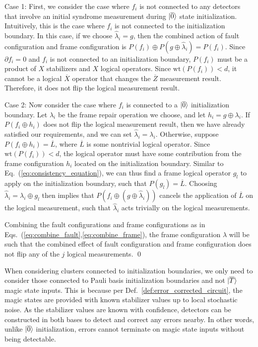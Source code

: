 Case 1: First, we consider the case where $f_i$ is not connected to any detectors that involve an initial syndrome measurement during $|{\overline{0}}\rangle$ state initialization.
%
Intuitively, this is the case where $f_i$ is not connected to the initialization boundary.
%
In this case, if we choose $\hat{\lambda}_i=g$, then the combined action of fault configuration and frame configuration is $P(f_i)\oplus P(g\oplus \hat{\lambda}_i)=P(f_i)$.
%
Since $\partial f_i=0$ and $f_i$ is not connected to an initialization boundary, $P(f_i)$ must be a product of $X$ stabilizers and $X$ logical operators.
%
Since $\textrm{wt}(P(f_i))<d$, it cannot be a logical $\overline{X}$ operator that changes the $\overline{Z}$ measurement result.
%
Therefore, it does not flip the logical measurement result.

Case 2: Now consider the case where $f_i$ is connected to a $|{\overline{0}}\rangle$ initialization boundary.
%
Let $\lambda_i$ be the frame repair operation we choose, and let $h_i=g\oplus\lambda_i$.
%
If $P(f_i\oplus h_i)$ does not flip the logical measurement result, then we have already satisfied our requirements, and we can set $\hat{\lambda}_i=\lambda_i$.
%
Otherwise, suppose $P(f_i\oplus h_i)=\overline{L}$, where $\overline{L}$ is some nontrivial logical operator.
%
Since $\textrm{wt}(P(f_i))<d$, the logical operator must have some contribution from the frame configuration $h_i$ located on the initialization boundary.
%
Similar to Eq.~(\ref{eq:consistency_equation}), we can thus find a frame logical operator $g_l$ to apply on the initialization boundary, such that $P(g_l)=\overline{L}$.
%
Choosing $\hat{\lambda}_i=\lambda_i\oplus g_l$ then implies that $P(f_i\oplus(g\oplus \hat{\lambda}_i))$ cancels the application of $\overline{L}$ on the logical measurement, such that $\hat{\lambda}_i$ acts trivially on the logical measurements.

Combining the fault configurations and frame configurations as in Eqs.~(\ref{eq:combine_fault},\ref{eq:combine_frame}), the frame configuration $\hat{\lambda}$ will be such that the combined effect of fault configuration and frame configuration does not flip any of the $j$ logical measurements.
\qed

When considering clusters connected to initialization boundaries, we only need to consider those connected to Pauli basis initialization boundaries and not $|{\overline{T}}\rangle$ magic state inputs.
%
This is because per Def.~\ref{def:error_corrected_circuit}, the magic states are provided with known stabilizer values up to local stochastic noise.
%
As the stabilizer values are known with confidence, detectors can be constructed in both bases to detect and correct any errors nearby.
%
In other words, unlike $|{\overline{0}}\rangle$ initialization, errors cannot terminate on magic state inputs without being detectable.

